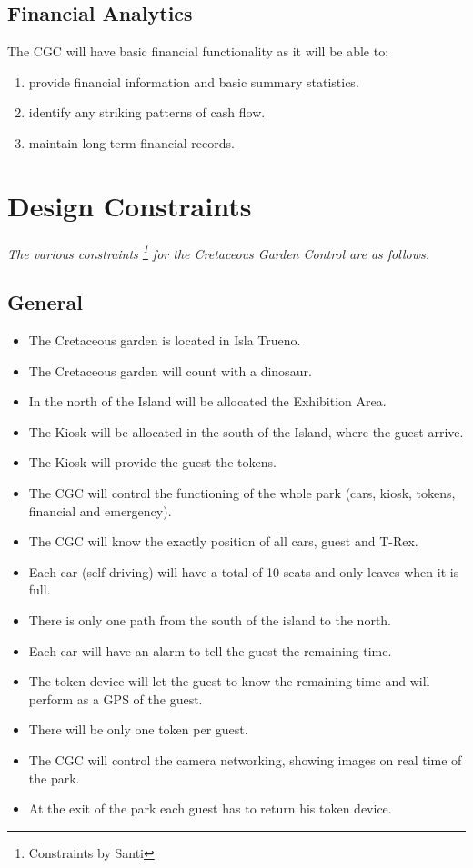\documentclass[12pt]{article}
\begin{document}
	\subsection{Financial Analytics} The CGC will have basic financial functionality as it will
	be able to:
	\begin{enumerate}
		\item provide financial information and basic summary statistics.
		\item identify any striking patterns of cash flow.
		\item maintain long term financial records.
	\end{enumerate}

\section{Design Constraints}
\label{con}
\paragraph{} \textit{The various constraints \footnote{Constraints by Santi} for the Cretaceous Garden Control are as follows.}
	\subsection{General}
	\begin{itemize}
		\item The Cretaceous garden is located in Isla Trueno.
		\item The Cretaceous garden will count with a dinosaur.
		\item In the north of the Island will be allocated the Exhibition Area.
		\item The Kiosk will be allocated in the south of the Island, where the guest arrive.
		\item The Kiosk will provide the guest the tokens.
		\item The CGC will control the functioning of the whole park (cars, kiosk, tokens, financial and emergency).
		\item The CGC will know the exactly position of all cars, guest and T-Rex.
		\item Each car (self-driving) will have a total of 10 seats and only leaves when it is full.
		\item There is only one path from the south of the island to the north.
		\item Each car will have an alarm to tell the guest the remaining time.
		\item The token device will let the guest to know the remaining time and will perform as a GPS of the guest.
		\item There will be only one token per guest.
		\item The CGC will control the camera networking, showing images on real time of the park.
		\item At the exit of the park each guest has to return his token device.
	\end{itemize}
	
\end{document}
